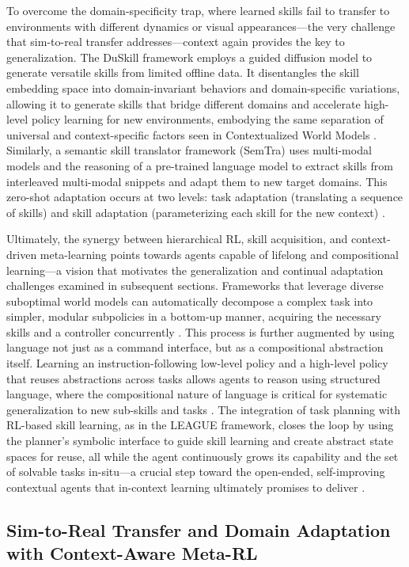 \documentclass[11pt]{article}
\begin{document}
To overcome the domain-specificity trap, where learned skills fail to transfer to environments with different dynamics or visual appearances---the very challenge that sim-to-real transfer addresses---context again provides the key to generalization. The DuSkill framework employs a guided diffusion model to generate versatile skills from limited offline data. It disentangles the skill embedding space into domain-invariant behaviors and domain-specific variations, allowing it to generate skills that bridge different domains and accelerate high-level policy learning for new environments, embodying the same separation of universal and context-specific factors seen in Contextualized World Models \cite{ref392}. Similarly, a semantic skill translator framework (SemTra) uses multi-modal models and the reasoning of a pre-trained language model to extract skills from interleaved multi-modal snippets and adapt them to new target domains. This zero-shot adaptation occurs at two levels: task adaptation (translating a sequence of skills) and skill adaptation (parameterizing each skill for the new context) \cite{ref393}.

Ultimately, the synergy between hierarchical RL, skill acquisition, and context-driven meta-learning points towards agents capable of lifelong and compositional learning---a vision that motivates the generalization and continual adaptation challenges examined in subsequent sections. Frameworks that leverage diverse suboptimal world models can automatically decompose a complex task into simpler, modular subpolicies in a bottom-up manner, acquiring the necessary skills and a controller concurrently \cite{ref394}. This process is further augmented by using language not just as a command interface, but as a compositional abstraction itself. Learning an instruction-following low-level policy and a high-level policy that reuses abstractions across tasks allows agents to reason using structured language, where the compositional nature of language is critical for systematic generalization to new sub-skills and tasks \cite{ref395}. The integration of task planning with RL-based skill learning, as in the LEAGUE framework, closes the loop by using the planner's symbolic interface to guide skill learning and create abstract state spaces for reuse, all while the agent continuously grows its capability and the set of solvable tasks in-situ---a crucial step toward the open-ended, self-improving contextual agents that in-context learning ultimately promises to deliver \cite{ref396}.

\subsection{Sim-to-Real Transfer and Domain Adaptation with Context-Aware Meta-RL}
\end{document}
